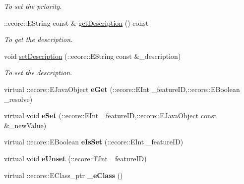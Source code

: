 \begin{DoxyCompactItemize}
\begin{DoxyCompactList}\small\item\em To set the priority. \item\end{DoxyCompactList}\item 
::ecore::EString const \& \hyperlink{classTMS__Data_1_1Queue_aba3e75c89f52e4ec03f6056ab40c23b8}{getDescription} () const 
\begin{DoxyCompactList}\small\item\em To get the description. \item\end{DoxyCompactList}\item 
void \hyperlink{classTMS__Data_1_1Queue_aee05aa3ef782710ace08a7df4b2cfedf}{setDescription} (::ecore::EString const \&\_\-description)
\begin{DoxyCompactList}\small\item\em To set the description. \item\end{DoxyCompactList}\item 
\hypertarget{classTMS__Data_1_1Queue_a2ca1f8d697fffd0e8d2db3323fbc865f}{
virtual ::ecore::EJavaObject {\bfseries eGet} (::ecore::EInt \_\-featureID,::ecore::EBoolean \_\-resolve)}
\label{classTMS__Data_1_1Queue_a2ca1f8d697fffd0e8d2db3323fbc865f}

\item 
\hypertarget{classTMS__Data_1_1Queue_a1b661099925e8e76819391da9d01a3b8}{
virtual void {\bfseries eSet} (::ecore::EInt \_\-featureID,::ecore::EJavaObject const \&\_\-newValue)}
\label{classTMS__Data_1_1Queue_a1b661099925e8e76819391da9d01a3b8}

\item 
\hypertarget{classTMS__Data_1_1Queue_aad2b5b6d101b7288632fa66cfaa18912}{
virtual ::ecore::EBoolean {\bfseries eIsSet} (::ecore::EInt \_\-featureID)}
\label{classTMS__Data_1_1Queue_aad2b5b6d101b7288632fa66cfaa18912}

\item 
\hypertarget{classTMS__Data_1_1Queue_a3b865222c21f39665315f44012839262}{
virtual void {\bfseries eUnset} (::ecore::EInt \_\-featureID)}
\label{classTMS__Data_1_1Queue_a3b865222c21f39665315f44012839262}

\item 
\hypertarget{classTMS__Data_1_1Queue_a675529cccf92301a64e3c5eff5ae9f53}{
virtual ::ecore::EClass\_\-ptr {\bfseries \_\-eClass} ()}
\label{classTMS__Data_1_1Queue_a675529cccf92301a64e3c5eff5ae9f53}

\end{DoxyCompactItemize}
